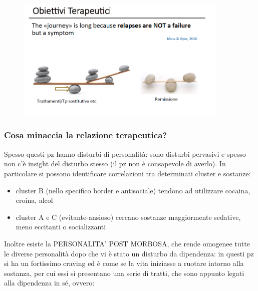 \begin{figure}[!ht]
\centering
	\includegraphics[width=0.9\textwidth]{017/image5.png}
\end{figure}

\subsubsection{Cosa minaccia la relazione terapeutica?}

Spesso questi pz hanno disturbi di personalità: sono disturbi pervasivi
e spesso non c'è insight del disturbo stesso (il pz non è consapevole di
averlo). In particolare si possono identificare correlazioni tra
determinati cluster e sostanze:

\begin{itemize}
\item
  cluster B (nello specifico border e antisociale) tendono ad
  utilizzare cocaina, eroina, alcol
\item
  
  cluster A e C (evitante-ansioso) cercano sostanze maggiormente
  sedative, meno eccitanti o socializzanti
\end{itemize}

Inoltre esiste la PERSONALITA' POST MORBOSA, che rende omogenee tutte le
diverse personalità dopo che vi è stato un disturbo da dipendenza: in
questi pz si ha un fortissimo craving ed è come se la vita iniziasse a
ruotare intorno alla sostanza, per cui essi si presentano una serie di
tratti, che sono appunto legati alla dipendenza in sé, ovvero:

